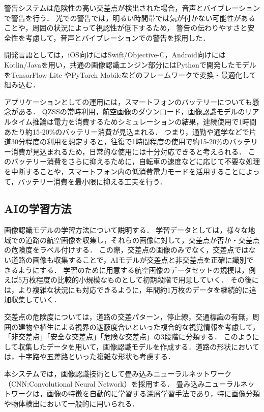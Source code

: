 \documentclass[uplatex,dvipdfmx]{jsarticle}
\begin{document}
警告システムは危険性の高い交差点が検出された場合，音声とバイブレーションで警告を行う．
光での警告では，明るい時間帯では気が付かない可能性があることや，周囲の状況によって視認性が低下するため，
警告の伝わりやすさと安全性を考慮して，音声とバイブレーションでの警告を採用した．

開発言語としては，iOS向けにはSwift/Objective-C，Android向けにはKotlin/Javaを用い，共通の画像認識エンジン部分にはPythonで開発したモデルをTensorFlow Lite やPyTorch
Mobileなどのフレームワークで変換・最適化して組み込む．

アプリケーションとしての運用には，スマートフォンのバッテリーについても懸念がある．
QZSSの常時利用，航空画像のダウンロード，画像認識モデルのリアルタイム推論は電力を消費するためシミュレーションの結果，連続使用で1時間あたり約15-20\%のバッテリー消費が見込まれる．
つまり，通勤や通学などで片道30分程度の利用を想定すると，往復で1時間程度の使用で約15-20\%のバッテリー消費が見込まれるため，日常的な使用には十分対応できると考えられる．
このバッテリー消費をさらに抑えるために，自転車の速度などに応じて不要な処理を中断することや，スマートフォン内の低消費電力モードを活用することによって，バッテリー消費を最小限に抑える工夫を行う．

\subsection{AIの学習方法}
画像認識モデルの学習方法について説明する．
学習データとしては，様々な地域での道路の航空画像を収集し，それらの画像に対して，交差点か否か・交差点の危険度をラベル付けする．
この際，交差点の画像のみでなく，交差点ではない道路の画像も収集することで，AIモデルが交差点と非交差点を正確に識別できるようにする．
学習のために用意する航空画像のデータセットの規模は，例えば5万枚程度の比較的小規模なものとして初期段階で用意していく．
その後には，より複雑な状況にも対応できるように，年間約1万枚のデータを継続的に追加収集していく．

交差点の危険度については，道路の交差パターン，停止線，交通標識の有無，周囲の建物や植生による視界の遮蔽度合いといった複合的な視覚情報を考慮して，「非交差点」「安全な交差点」「危険な交差点」の3段階に分類する．
このようにして収集したデータを用いて，画像認識モデルを作成する．道路の形状においては，十字路や五差路といった複雑な形状も考慮する．

本システムでは，画像認識技術として畳み込みニューラルネットワーク（CNN:Convolutional Neural Network）を採用する．
畳み込みニューラルネットワークは，画像の特徴を自動的に学習する深層学習手法であり，特に画像分類や物体検出において一般的に用いられる\cite{ref:newral}．
\end{document}
